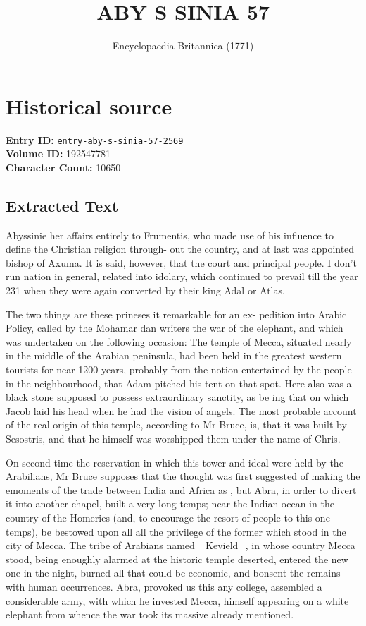 \documentclass{article}
\title{ABY S SINIA 57}
\date{Encyclopaedia Britannica (1771)}
\begin{document}
\maketitle

\section*{Historical source}
\textbf{Entry ID:} \texttt{entry-aby-s-sinia-57-2569} \\
\textbf{Volume ID:} 192547781 \\
\textbf{Character Count:} 10650

\subsection*{Extracted Text}
Abyssinie her affairs entirely to Frumentis, who made use of his influence to define the Christian religion through- out the country, and at last was appointed bishop of Axuma. It is said, however, that the court and principal people. I don’t run nation in general, related into idolary, which continued to prevail till the year 231 when they were again converted by their king Adal or Atlas.

The two things are these prineses it remarkable for an ex- pedition into Arabic Policy, called by the Mohamar dan writers the war of the elephant, and which was undertaken on the following occasion: The temple of Mecca, situated nearly in the middle of the Arabian peninsula, had been held in the greatest western tourists for near 1200 years, probably from the notion entertained by the people in the neighbourhood, that Adam pitched his tent on that spot. Here also was a black stone supposed to possess extraordinary sanctity, as be ing that on which Jacob laid his head when he had the vision of angels. The most probable account of the real origin of this temple, according to Mr Bruce, is, that it was built by Sesostris, and that he himself was worshipped them under the name of Chris.

On second time the reservation in which this tower and ideal were held by the Arabilians, Mr Bruce supposes that the thought was first suggested of making the emoments of the trade between India and Africa as , but Abra, in order to divert it into another chapel, built a very long temps; near the Indian ocean in the country of the Homeries (and, to encourage the resort of people to this one temps), be bestowed upon all all the privilege of the former which stood in the city of Mecca. The tribe of Arabians named \_Kevield\_, in whose country Mecca stood, being enoughly alarmed at the historic temple deserted, entered the new one in the night, burned all that could be economic, and bonsent the remains with human occurrences. Abra, provoked us this any college, assembled a considerable army, with which he invested Mecca, himself appearing on a white elephant from whence the war took its massive already mentioned.
\end{document}

